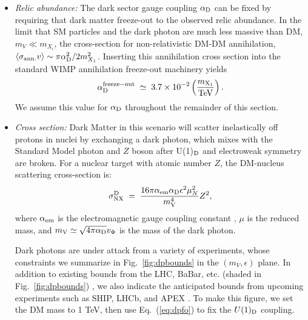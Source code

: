 \documentclass[11pt]{article}
\begin{document}
\begin{itemize}
\item{\it Relic abundance:} The dark sector gauge coupling $\alpha_{\rm D}$ can be fixed by requiring that dark matter freeze-out to the observed relic abundance. In the limit that SM particles and the dark photon are much less massive than DM, $m_{V} \ll m_{X_{i}}$, the cross-section for non-relativistic DM-DM annihilation, $\left\langle\sigma_{\rm ann.} v\right\rangle \sim \pi \alpha_{\rm D}^2/2 m_{X_{1}}^2$.  Inserting this annihilation cross section into the standard WIMP annihilation freeze-out machinery \cite{Kolb:1990vq,Pospelov:2008jd} yields 
\begin{equation}
\alpha_{\rm D}^{\rm freeze-out} \; \simeq \; 3.7 \times 10^{-2} \left( \frac{m_{\rm X_1}}{{\rm TeV}} \right).
\label{eq:dpfo}
\end{equation}
We assume this value for $\alpha_{\rm D}$ throughout the remainder of this section.
\item{\it Cross section:} Dark Matter in this scenario will scatter inelastically off protons in nuclei by exchanging a dark photon, which mixes with the Standard Model photon and $Z$ boson after U(1)$_{\rm D}$  and electroweak symmetry are broken. For a nuclear target with atomic number $Z$, the DM-nucleus scattering cross-section is:
\begin{equation}
\sigma_{\rm N X}^{\rm D} \; = \; \frac{16 \pi \alpha_{\rm em} \alpha_{\rm D} \epsilon^2 \mu_N^2}{m_{\rm V}^4} Z^2,
\label{eq:dpcrosssectionN}
\end{equation}
where $\alpha_{\rm em}$ is the electromagnetic gauge coupling constant , $\mu$ is the reduced mass, and $m_{\rm V} \simeq  \sqrt{4 \pi \alpha_{\rm D}} v_{\Phi}$ is the mass of the dark photon.

Dark photons are under attack from a variety of experiments, whose constraints we summarize in Fig.~\ref{fig:dpbounds} in the $(m_V, \epsilon)$ plane.  In addition to existing bounds from the LHC, BaBar, etc. (shaded in Fig.~\ref{fig:dpbounds}) \cite{Abrahamyan:2011gv,Essig:2013lka,Goudzovski:2014rwa,Merkel:2014avp,Batell:2014mga,Curtin:2014cca}, we also indicate the anticipated bounds from upcoming experiments such as SHIP, LHCb, and APEX \cite{Beranek:2013yqa,Alekhin:2015byh,Ilten:2015hya,Moreno:2013mja}. To make this figure, we set the DM mass to 1 TeV, then use Eq.~(\ref{eq:dpfo}) to fix the $U(1)_{\rm D}$ coupling. 


\end{itemize}
\end{document}
